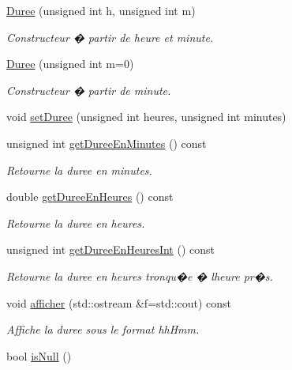 \begin{DoxyCompactItemize}
\item 
\hyperlink{class_t_i_m_e_1_1_duree_ae0532a0d60dbc31773f038967dfe220e}{Duree} (unsigned int h, unsigned int m)
\begin{DoxyCompactList}\small\item\em Constructeur � partir de heure et minute. \end{DoxyCompactList}\item 
\hyperlink{class_t_i_m_e_1_1_duree_a0f99878e52fad2f9e0643301c70d9ef7}{Duree} (unsigned int m=0)
\begin{DoxyCompactList}\small\item\em Constructeur � partir de minute. \end{DoxyCompactList}\item 
void \hyperlink{class_t_i_m_e_1_1_duree_aabba3e357861f21faa8419339f7b7176}{set\+Duree} (unsigned int heures, unsigned int minutes)
\item 
unsigned int \hyperlink{class_t_i_m_e_1_1_duree_a1e47fb5f0734ec562e2f9dba32db45f4}{get\+Duree\+En\+Minutes} () const 
\begin{DoxyCompactList}\small\item\em Retourne la duree en minutes. \end{DoxyCompactList}\item 
double \hyperlink{class_t_i_m_e_1_1_duree_afb11d106fc1f6761a68f486dc7a17564}{get\+Duree\+En\+Heures} () const 
\begin{DoxyCompactList}\small\item\em Retourne la duree en heures. \end{DoxyCompactList}\item 
unsigned int \hyperlink{class_t_i_m_e_1_1_duree_aeb43e9bde7803d89edbabf040c962f9b}{get\+Duree\+En\+Heures\+Int} () const 
\begin{DoxyCompactList}\small\item\em Retourne la duree en heures tronqu�e � l\textquotesingle{}heure pr�s. \end{DoxyCompactList}\item 
void \hyperlink{class_t_i_m_e_1_1_duree_ad957a58f8bc103857f3e494bab5f60e1}{afficher} (std\+::ostream \&f=std\+::cout) const 
\begin{DoxyCompactList}\small\item\em Affiche la duree sous le format hh\+Hmm. \end{DoxyCompactList}\item 
bool \hyperlink{class_t_i_m_e_1_1_duree_a96ac8dafc768f4c52d6811a5a89cafbc}{is\+Null} ()
\end{DoxyCompactItemize}


